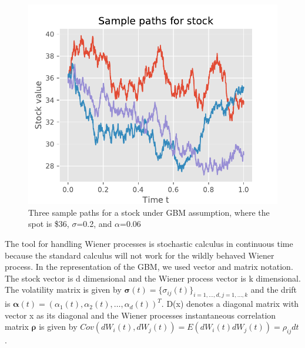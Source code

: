 \begin{figure}[th]
\centering
\includegraphics{Figures/samplePath.pdf}
\decoRule
\caption[Sample Path for Stocks]{Three sample paths for a stock under GBM assumption, where the spot is \$36, $\sigma$=0.2, and $\alpha$=0.06}
\label{fig:BM}
\end{figure}

The tool for handling Wiener processes is stochastic calculus in continuous time because the standard calculus will not work for the wildly behaved Wiener process. In the representation of the GBM, we used vector and matrix notation. The stock vector is d dimensional and the Wiener process vector is k dimensional. The volatility matrix is given by $\bm{\sigma}(t)=\{\sigma_{ij}(t)\}_{i=1,\ldots,d,j=1,\ldots,k}$ and the drift is $\bm{\alpha}(t)=(\alpha_1(t), \alpha_2(t), \ldots, \alpha_d(t))^T$. D(x) denotes a diagonal matrix with vector x as its diagonal and the Wiener processes instantaneous correlation matrix $\bm{\rho}$ is given by $Cov(dW_i(t),dW_j(t))=E(dW_i(t)dW_j(t))=\rho_{ij}dt$.

